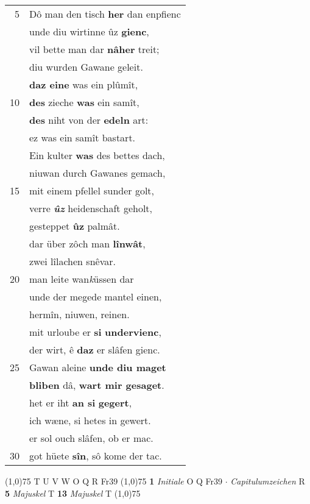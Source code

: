 \documentclass[8pt,a4paper,notitlepage]{article}
\begin{document}
\begin{table}[ht]
\begin{minipage}[t]{0.5\linewidth}
\begin{tabular}{rl}
5 & Dô man den tisch \textbf{her} dan enpfienc\\ 
 & unde diu wirtinne ûz \textbf{gienc},\\ 
 & vil bette man dar \textbf{nâher} treit;\\ 
 & diu wurden Gawane geleit.\\ 
 & \textbf{daz eine} was ein plûmît,\\ 
10 & \textbf{des} zieche \textbf{was} ein samît,\\ 
 & \textbf{des} niht von der \textbf{edeln} art:\\ 
 & ez was ein samît bastart.\\ 
 & Ein kulter \textbf{was} des bettes dach,\\ 
 & niuwan durch Gawanes gemach,\\ 
15 & mit einem pfellel sunder golt,\\ 
 & verre \textit{\textbf{ûz}} heidenschaft geholt,\\ 
 & gesteppet \textbf{ûz} palmât.\\ 
 & dar über zôch man \textbf{lînwât},\\ 
 & zwei lîlachen snêvar.\\ 
20 & man leite wan\textit{k}üssen dar\\ 
 & unde der megede mantel einen,\\ 
 & hermîn, niuwen, reinen.\\ 
 & mit urloube er \textbf{si} \textbf{undervienc},\\ 
 & der wirt, ê \textbf{daz} er slâfen gienc.\\ 
25 & Gawan aleine \textbf{unde diu maget}\\ 
 & \textbf{bliben} dâ, \textbf{wart mir gesaget}.\\ 
 & het er iht \textbf{an si} \textbf{gegert},\\ 
 & ich wæne, si hetes in gewert.\\ 
 & er sol ouch slâfen, ob er mac.\\ 
30 & got hüete \textbf{sîn}, sô kome der tac.\\ 
\end{tabular}
\scriptsize
\line(1,0){75} \newline
T U V W O Q R Fr39 \newline
\line(1,0){75} \newline
\textbf{1} \textit{Initiale} O Q Fr39   $\cdot$ \textit{Capitulumzeichen} R  \textbf{5} \textit{Majuskel} T  \textbf{13} \textit{Majuskel} T  \newline
\line(1,0){75} \newline

\end{minipage}
\end{table}
\end{document}
